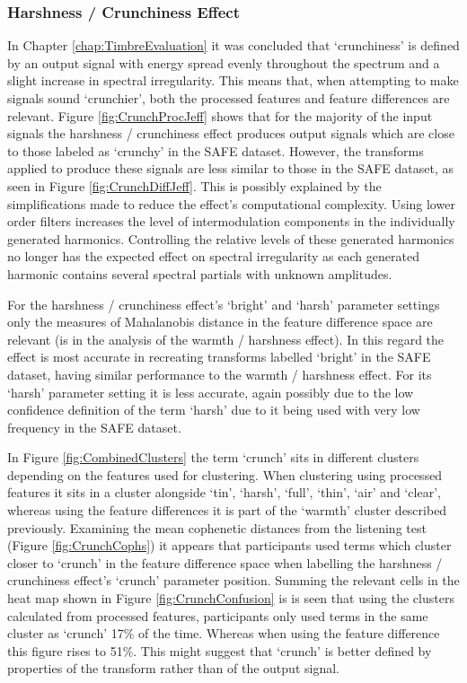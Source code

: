 		\subsubsection*{Harshness / Crunchiness Effect}
			In Chapter \ref{chap:TimbreEvaluation} it was concluded that `crunchiness' is defined by an output
			signal with energy spread evenly throughout the spectrum and a slight increase in spectral
			irregularity. This means that, when attempting to make signals sound `crunchier', both the
			processed features and feature differences are relevant.  Figure \ref{fig:CrunchProcJeff} shows
			that for the majority of the input signals the harshness / crunchiness effect produces output
			signals which are close to those labeled as `crunchy' in the SAFE dataset. However, the transforms
			applied to produce these signals are less similar to those in the SAFE dataset, as seen in Figure
			\ref{fig:CrunchDiffJeff}. This is possibly explained by the simplifications made to reduce the
			effect's computational complexity. Using lower order filters increases the level of intermodulation
			components in the individually generated harmonics. Controlling the relative levels of these
			generated harmonics no longer has the expected effect on spectral irregularity as each generated
			harmonic contains several spectral partials with unknown amplitudes.

			For the harshness / crunchiness effect's `bright' and `harsh' parameter settings only the measures
			of Mahalanobis distance in the feature difference space are relevant (is in the analysis of the
			warmth / harshness effect). In this regard the effect is most accurate in recreating transforms
			labelled `bright' in the SAFE dataset, having similar performance to the warmth / harshness effect.
			For its `harsh' parameter setting it is less accurate, again possibly due to the low confidence
			definition of the term `harsh' due to it being used with very low frequency in the SAFE dataset.

			In Figure \ref{fig:CombinedClusters} the term `crunch' sits in different clusters depending on the
			features used for clustering. When clustering using processed features it sits in a cluster
			alongside `tin', `harsh', `full', `thin', `air' and `clear', whereas using the feature differences
			it is part of the `warmth' cluster described previously. Examining the mean cophenetic distances
			from the listening test (Figure \ref{fig:CrunchCophs}) it appears that participants used terms
			which cluster closer to `crunch' in the feature difference space when labelling the harshness /
			crunchiness effect's `crunch' parameter position. Summing the relevant cells in the heat map shown
			in Figure \ref{fig:CrunchConfusion} is is seen that using the clusters calculated from processed
			features, participants only used terms in the same cluster as `crunch' 17\% of the time. Whereas
			when using the feature difference this figure rises to 51\%. This might suggest that `crunch' is
			better defined by properties of the transform rather than of the output signal.

